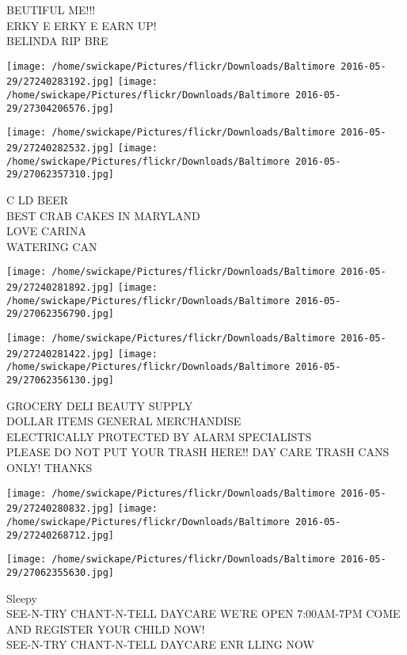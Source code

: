 \documentclass[10pt,letterpaper]{article}
\begin{document}
BEUTIFUL ME!!!\\
ERKY E ERKY E EARN UP!\\
BELINDA RIP BRE\\
\pagebreak

\texttt{[image: /home/swickape/Pictures/flickr/Downloads/Baltimore 2016-05-29/27240283192.jpg]}
\texttt{[image: /home/swickape/Pictures/flickr/Downloads/Baltimore 2016-05-29/27304206576.jpg]}

\texttt{[image: /home/swickape/Pictures/flickr/Downloads/Baltimore 2016-05-29/27240282532.jpg]}
\texttt{[image: /home/swickape/Pictures/flickr/Downloads/Baltimore 2016-05-29/27062357310.jpg]}

C LD BEER\\
BEST CRAB CAKES IN MARYLAND\\
LOVE CARINA\\
WATERING CAN\\
\pagebreak

\texttt{[image: /home/swickape/Pictures/flickr/Downloads/Baltimore 2016-05-29/27240281892.jpg]}
\texttt{[image: /home/swickape/Pictures/flickr/Downloads/Baltimore 2016-05-29/27062356790.jpg]}

\texttt{[image: /home/swickape/Pictures/flickr/Downloads/Baltimore 2016-05-29/27240281422.jpg]}
\texttt{[image: /home/swickape/Pictures/flickr/Downloads/Baltimore 2016-05-29/27062356130.jpg]}

GROCERY DELI BEAUTY SUPPLY\\
DOLLAR ITEMS GENERAL MERCHANDISE\\
ELECTRICALLY PROTECTED BY ALARM SPECIALISTS\\
PLEASE DO NOT PUT YOUR TRASH HERE!! DAY CARE TRASH CANS ONLY!  THANKS\\
\pagebreak

\texttt{[image: /home/swickape/Pictures/flickr/Downloads/Baltimore 2016-05-29/27240280832.jpg]}
\texttt{[image: /home/swickape/Pictures/flickr/Downloads/Baltimore 2016-05-29/27240268712.jpg]}

\vspace{0.25in}
\texttt{[image: /home/swickape/Pictures/flickr/Downloads/Baltimore 2016-05-29/27062355630.jpg]}

Sleepy\\
SEE{-}N{-}TRY CHANT{-}N{-}TELL DAYCARE WE'RE OPEN 7:00AM{-}7PM COME AND REGISTER YOUR CHILD NOW!\\
SEE{-}N{-}TRY CHANT{-}N{-}TELL DAYCARE ENR LLING NOW\\
\pagebreak
\end{document}
